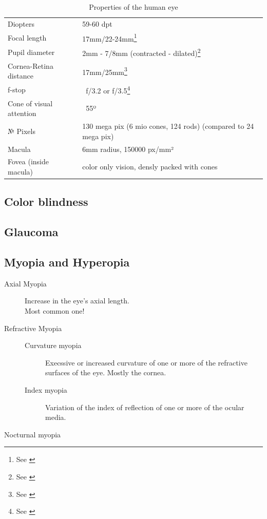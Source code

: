 \documentclass{acm_proc_article-sp}
\begin{document}
\begin{table}
    \centering
    \begin{tabular}{ll}
        Diopters                & 59-60 dpt \\
        Focal length            & 17mm/22-24mm\footnote{See \cite{eye-focal, eyeascamera}} \\
        Pupil diameter          & 2mm - 7/8mm (contracted - dilated)\footnote{See \cite{eyeascamera}} \\
        Cornea-Retina distance  & 17mm/25mm\footnote{See \cite{eyeascamera}} \\
        f-stop                  & ~f/3.2 or f/3.5\footnote{See \cite{eyeascamera}} \\
        Cone of visual attention& ~55º \\
        № Pixels                & 130 mega pix (6 mio cones, 124 rods) (compared to 24 mega pix) \\
        Macula                  & 6mm radius, 150000 px/mm²\\
        Fovea (inside macula)   & color only vision, densly packed with cones \\
    \end{tabular}
    \caption{Properties of the human eye}
    \label{tab:eyeproperties}
\end{table}

\subsection{Color blindness}
\subsection{Glaucoma}
\subsection{Myopia and Hyperopia}
\begin{description}
\item[Axial Myopia]
    Increase in the eye's axial length.\\
    Most common one!
\item[Refractive Myopia]
    \begin{description}
    \item[Curvature myopia]
    Execssive or increased curvature of one or more of the refractive surfaces of the eye. Mostly the cornea.
    \item[Index myopia]
    Variation of the index of reflection of one or more of the ocular media.
    \end{description}
\item[Nocturnal myopia]
\end{description}
\end{document}
